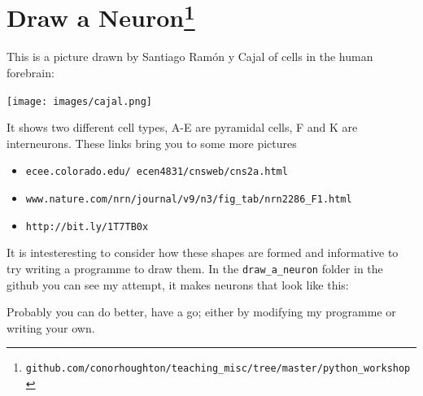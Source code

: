 \documentclass[11pt,a4paper]{scrartcl}
\begin{document}
\section*{Draw a Neuron\footnote{\texttt{github.com/conorhoughton/teaching\_misc/tree/master/python\_workshop}}}

This is a picture drawn by Santiago Ram\'{o}n y Cajal of cells in the human forebrain:
\begin{center}
\texttt{[image: images/cajal.png]}
\end{center} 
It shows two different cell types, A-E are pyramidal cells, F and K are interneurons. These links bring you to some more pictures 
\begin{itemize}
\item \texttt{ecee.colorado.edu/~ecen4831/cnsweb/cns2a.html}
\item \texttt{www.nature.com/nrn/journal/v9/n3/fig\_tab/nrn2286\_F1.html}
\item \texttt{http://bit.ly/1T7TB0x}
\end{itemize}
It is intesteresting to consider how these shapes are formed and
informative to try writing a programme to draw them. In the
\texttt{draw\_a\_neuron} folder in the github you can see my attempt,
it makes neurons that look like this:
\begin{center}
\end{center}
Probably you can do better, have a go; either by modifying my
programme or writing your own.
\end{document}
